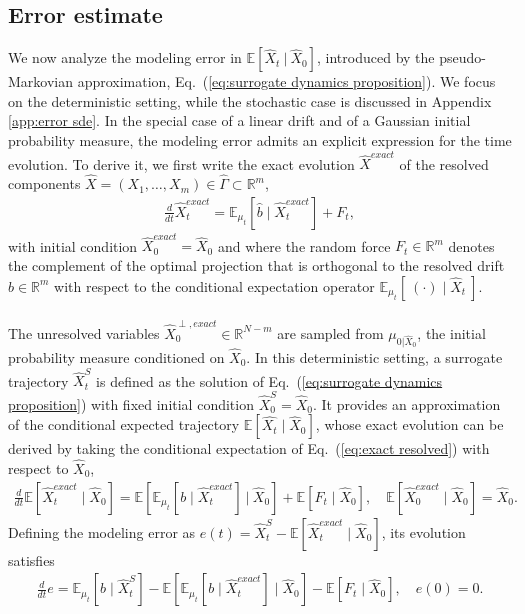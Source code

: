 \documentclass[11pt, a4paper, oneside, reqno]{amsart}
\begin{document}
\subsection{Error estimate}\label{sec:error estimate}
\noindent We now analyze the modeling error in $\mathbb{E}[\hat{X}_t\: | \: \hat{X}_0]$, introduced by the pseudo-Markovian approximation, Eq.~(\ref{eq:surrogate dynamics proposition}). We focus on the deterministic setting, while the stochastic case is discussed in Appendix \ref{app:error sde}. 
In the special case of a linear drift and of a Gaussian initial probability measure, the modeling error admits an explicit expression for the time evolution.
To derive it, we first write the exact evolution $\hat{X}^{exact}$ of the resolved components $\hat{X}=(X_1,\dots,X_m)\in\hat{\Gamma}\subset\mathbb{R}^m$,
\begin{eqnarray}\label{eq:exact resolved}
    \frac{d}{dt}\hat{X}^{exact}_t = \mathbb{E}_{\mu_t}[\hat{b}\mid \hat{X}^{exact}_t] + F_t,
\end{eqnarray}
with initial condition $\hat{X}^{exact}_0 = \hat{X}_0$ and
where the random force $F_t \in \mathbb{R}^m$ denotes the complement of the optimal projection that is orthogonal to the resolved drift $\hat{b}\in\mathbb{R}^m$ with respect to the conditional expectation operator  $\mathbb{E}_{\mu_t}[\:(\cdot)\mid\hat{X}_t\:]$.
\\ \ \\
The unresolved variables $\hat{X}_0^{\perp ,exact} \in\mathbb{R}^{N-m}$ are sampled from $\mu_{0|\hat{X}_0}$, the initial probability measure conditioned on $\hat{X}_0$.  
In this deterministic setting, a surrogate trajectory $\hat{X}^S_t$ is defined as the solution of Eq.~(\ref{eq:surrogate dynamics proposition}) with fixed initial condition $\hat{X}^{S}_0 = \hat{X}_0$.
It provides an approximation of the conditional expected trajectory $\mathbb{E}[\hat{X_t}\mid\hat{X}_0]$, whose exact evolution can be derived by taking the conditional expectation of Eq.~(\ref{eq:exact resolved}) with respect to $\hat{X}_0$,
\begin{eqnarray}
    \frac{d}{dt}\mathbb{E}[\hat{X}^{exact}_t\mid \hat{X}_0] = \mathbb{E}\left[\mathbb{E}_{\mu_t}[b\mid\hat{X}^{exact}_t] \:\big|\: \hat{X}_0 \right] + \mathbb{E}[F_t\mid\hat{X}_0],\quad
    \mathbb{E}[\hat{X}_0^{exact}\mid\hat{X}_0] = \hat{X}_0.
\end{eqnarray}
Defining the modeling error as $e(t)=\hat{X}^S_t-\mathbb{E}[\hat{X}^{exact}_t\mid\hat{X}_0]$, its evolution satisfies
\begin{eqnarray}
    \frac{d}{dt}e = \mathbb{E}_{\mu_t}[b\mid\hat{X}^S_t] - \mathbb{E}\left[\mathbb{E}_{\mu_t}[b\mid\hat{X}^{exact}_t] \mid \hat{X}_0 \right] - \mathbb{E}[F_t\mid\hat{X}_0],\quad
    e(0)=0.
\end{eqnarray}
\end{document}

